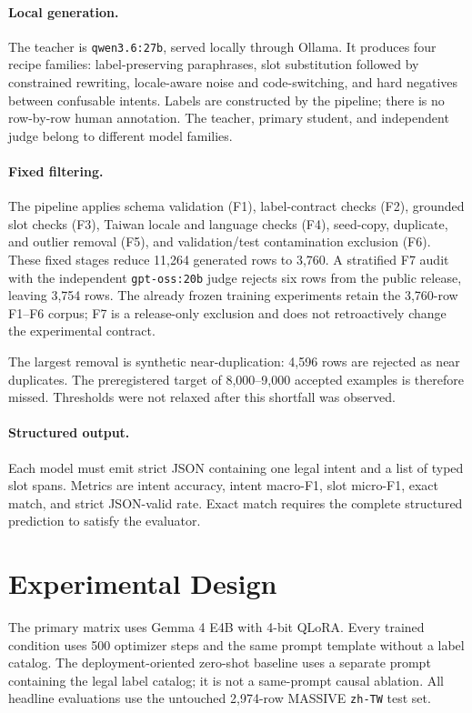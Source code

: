 \documentclass[11pt]{article}
\begin{document}
\paragraph{Local generation.}
The teacher is \texttt{qwen3.6:27b}, served locally through Ollama.  It produces
four recipe families: label-preserving paraphrases, slot substitution followed
by constrained rewriting, locale-aware noise and code-switching, and hard
negatives between confusable intents.  Labels are constructed by the pipeline;
there is no row-by-row human annotation.  The teacher, primary student, and
independent judge belong to different model families.

\paragraph{Fixed filtering.}
The pipeline applies schema validation (F1), label-contract checks (F2), grounded
slot checks (F3), Taiwan locale and language checks (F4), seed-copy, duplicate,
and outlier removal (F5), and validation/test contamination exclusion (F6).
These fixed stages reduce 11,264 generated rows to 3,760.  A stratified F7 audit
with the independent \texttt{gpt-oss:20b} judge rejects six rows from the public
release, leaving 3,754 rows.  The already frozen training experiments retain the
3,760-row F1--F6 corpus; F7 is a release-only exclusion and does not retroactively
change the experimental contract.

The largest removal is synthetic near-duplication: 4,596 rows are rejected as
near duplicates.  The preregistered target of 8,000--9,000 accepted examples is
therefore missed.  Thresholds were not relaxed after this shortfall was observed.

\paragraph{Structured output.}
Each model must emit strict JSON containing one legal intent and a list of typed
slot spans.  Metrics are intent accuracy, intent macro-F1, slot micro-F1, exact
match, and strict JSON-valid rate.  Exact match requires the complete structured
prediction to satisfy the evaluator.

\section{Experimental Design}
The primary matrix uses Gemma 4 E4B with 4-bit QLoRA.  Every trained condition
uses 500 optimizer steps and the same prompt template without a label catalog.
The deployment-oriented zero-shot baseline uses a separate prompt containing the
legal label catalog; it is not a same-prompt causal ablation.  All headline
evaluations use the untouched 2,974-row MASSIVE \texttt{zh-TW} test set.
\end{document}
